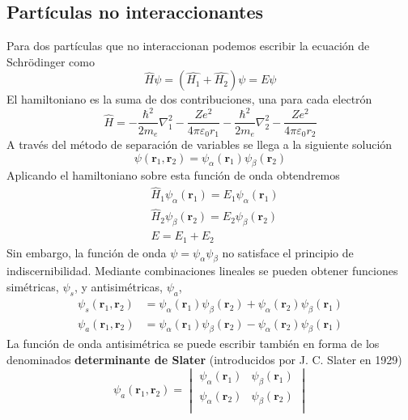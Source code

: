 \subsection{Partículas no interaccionantes}
Para dos partículas que no interaccionan podemos escribir la
ecuación de Schrödinger como
\begin{equation}
    \hat{H}\psi=(\hat{H_1} + \hat{H_2})\psi=E\psi
\end{equation}
El hamiltoniano es la suma de dos contribuciones, una para cada electrón
\begin{equation}
    \hat{H}=-\frac{\hbar^2}{2m_e}\nabla_1^2 -\frac{Ze^2}{4\pi \varepsilon_0r_1} 
    -\frac{\hbar^2}{2m_e}\nabla_2^2 -\frac{Ze^2}{4\pi \varepsilon_0r_2}
\label{eq:h1_h2}    
\end{equation}
A través del método de separación de variables se llega a la siguiente solución
\begin{equation}
    \psi(\mathbf{r}_1, \mathbf{r}_2) = \psi_\alpha (\mathbf{r}_1)\psi_\beta (\mathbf{r}_2)
\end{equation}
Aplicando el hamiltoniano sobre esta función de onda
obtendremos
\begin{align}
    &\hat{H}_1\psi_\alpha(\mathbf{r}_1)=E_1\psi_\alpha(\mathbf{r}_1)\\
    &\hat{H}_2\psi_\beta(\mathbf{r}_2)=E_2\psi_\beta(\mathbf{r}_2)\\
    &E = E_1+ E_2
\end{align}
Sin embargo, la función de onda $\psi=\psi_\alpha\psi_\beta$ 
no satisface el principio de indiscernibilidad. Mediante combinaciones
lineales se pueden obtener funciones simétricas, $\psi_s$,
y antisimétricas, $\psi_a$,
\begin{align}
    \psi_s(\mathbf{r}_1, \mathbf{r}_2) &=  \psi_\alpha(\mathbf{r}_1) \psi_\beta(\mathbf{r}_2) +  \psi_\alpha(\mathbf{r}_2) \psi_\beta(\mathbf{r}_1)\\
    \psi_a(\mathbf{r}_1, \mathbf{r}_2) &=  \psi_\alpha(\mathbf{r}_1) \psi_\beta(\mathbf{r}_2) -  \psi_\alpha(\mathbf{r}_2) \psi_\beta(\mathbf{r}_1)
\end{align}
La función de onda antisimétrica se puede escribir también en forma
de los denominados \textbf{determinante de Slater} (introducidos por
J. C. Slater en 1929)
\begin{equation}
    \psi_a(\mathbf{r}_1,\mathbf{r}_2) = 
    \begin{vmatrix} 
    \psi_\alpha(\mathbf{r}_1) & \psi_\beta(\mathbf{r}_1)   \\
    \psi_\alpha(\mathbf{r}_2) & \psi_\beta(\mathbf{r}_2)  \\
    \end{vmatrix}
\end{equation}
